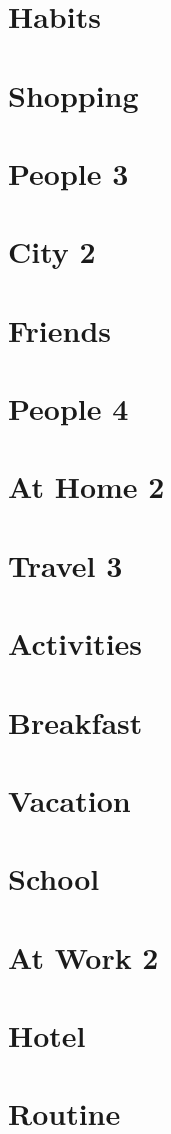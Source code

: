 \documentclass[a4paper,11pt,oneside]{book}
\begin{document}
\section{Habits}
\section{Shopping}
\section{People 3}
\section{City 2}
\section{Friends}
\section{People 4}
\section{At Home 2}
\section{Travel 3}
\section{Activities}
\section{Breakfast}
\section{Vacation}
\section{School}
\section{At Work 2}
\section{Hotel}
\section{Routine}
\end{document}
